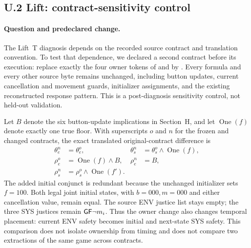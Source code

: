 \subsection*{U.2 Lift: contract-sensitivity control}
\label{supp:v64-lift-contrast}

\paragraph{Question and predeclared change.}
The Lift~T diagnosis depends on the recorded source contract and translation
convention. To test that dependence, we declared a second contract before
its execution: replace exactly the four  owner tokens of
 and  by .
Every formula and every other source byte remains unchanged, including
button updates, current cancellation and movement guards, initializer
assignments, and the existing reconstructed response pattern.
This is a post-diagnosis sensitivity control, not held-out validation.

Let $B$ denote the six button-update implications in Section~H, and let
$\operatorname{One}(f)$ denote exactly one true floor. With superscripts
$o$ and $n$ for the frozen and changed contracts, the exact translated
original-contract difference is
\[
\begin{aligned}
 \theta_e^n&=\theta_e^o,&
 \theta_s^n&=\theta_s^o\land\operatorname{One}(f),\\
 \rho_e^o&=\operatorname{One}(f)\land B,&
 \rho_e^n&=B,\\
 \rho_s^n&=\rho_s^o\land\operatorname{One}(f').
\end{aligned}
\]
The added initial conjunct is redundant because the unchanged initializer
sets $f=100$. Both legal joint initial states, with $b=000,m=000$ and
either cancellation value, remain equal. The source ENV justice list stays
empty; the three SYS justices remain $\mathsf{G}\mathsf{F}\neg m_i$.
Thus the owner change also changes temporal placement: current ENV safety
becomes initial and next-state SYS safety. This comparison does not isolate
ownership from timing and does not compare two extractions of the same
game across contracts.

